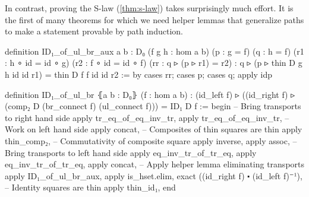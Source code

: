 In contrast, proving the S-law (\ref{thm:s-law})
takes surprisingly much effort.
It is the first of many theorems for which we need helper lemmas that
generalize paths to make a statement provable by path induction.
\begin{leancodebr}
definition ID₁_of_ul_br_aux {a b : D₀} (f g h : hom a b)
  (p : g = f) (q : h = f)
  (r1 : h ∘ id = id ∘ g) (r2 : f ∘ id = id ∘ f)
  (rr : q ▹ (p ▹ r1) = r2) :
  q ▹ (p ▹ thin D g h id id r1) = thin D f f id id r2 :=
by cases rr; cases p; cases q; apply idp

definition ID₁_of_ul_br ⦃a b : D₀⦄ (f : hom a b) :
  (id_left f) ▹ ((id_right f) ▹
  (comp₂ D (br_connect f) (ul_connect f))) = ID₁ D f :=
begin
  -- Bring transports to right hand side
  apply tr_eq_of_eq_inv_tr, apply tr_eq_of_eq_inv_tr,
  -- Work on left hand side
  apply concat,
    -- Composites of thin squares are thin
    apply thin_comp₂,
    -- Commutativity of composite square
    apply inverse, apply assoc,
  -- Bring transports to left hand side
  apply eq_inv_tr_of_tr_eq, apply eq_inv_tr_of_tr_eq,
  apply concat,
    -- Apply helper lemma eliminating transports
    apply ID₁_of_ul_br_aux, apply is_hset.elim,
    exact ((id_right f) ⬝ (id_left f)⁻¹),
  -- Identity squares are thin
  apply thin_id₁,
end
\end{leancodebr}

